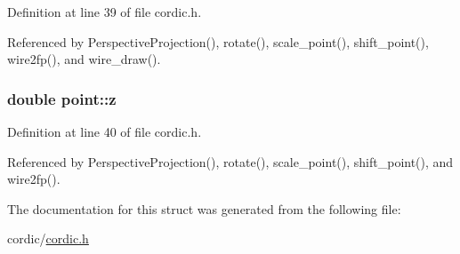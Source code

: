 Definition at line 39 of file cordic.\-h.



Referenced by Perspective\-Projection(), rotate(), scale\-\_\-point(), shift\-\_\-point(), wire2fp(), and wire\-\_\-draw().

\hypertarget{structpoint_aab1f0c3682401083b5bf252e7001874f}{
\subsubsection[{z}]{\setlength{\rightskip}{0pt plus 5cm}double point\-::z}}\label{structpoint_aab1f0c3682401083b5bf252e7001874f}


Definition at line 40 of file cordic.\-h.



Referenced by Perspective\-Projection(), rotate(), scale\-\_\-point(), shift\-\_\-point(), and wire2fp().



The documentation for this struct was generated from the following file\-:\begin{DoxyCompactItemize}
\item 
cordic/\hyperlink{cordic_8h}{cordic.\-h}\end{DoxyCompactItemize}
